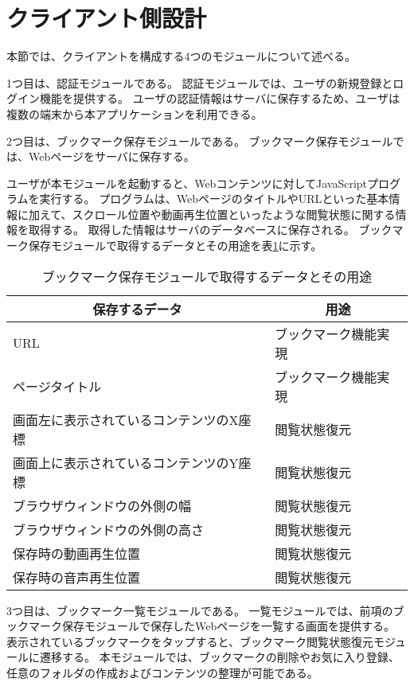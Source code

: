 \section{クライアント側設計}
本節では、クライアントを構成する4つのモジュールについて述べる。

1つ目は、認証モジュールである。
認証モジュールでは、ユーザの新規登録とログイン機能を提供する。
ユーザの認証情報はサーバに保存するため、ユーザは複数の端末から本アプリケーションを利用できる。

2つ目は、ブックマーク保存モジュールである。
ブックマーク保存モジュールでは、Webページをサーバに保存する。

ユーザが本モジュールを起動すると、Webコンテンツに対してJavaScriptプログラムを実行する。
プログラムは、WebページのタイトルやURLといった基本情報に加えて、スクロール位置や動画再生位置といったような閲覧状態に関する情報を取得する。
取得した情報はサーバのデータベースに保存される。
ブックマーク保存モジュールで取得するデータとその用途を表\ref{tb:design-save-bookmark-data-usage}に示す。

\begin{table}[htbp]
  \label{tb:design-save-bookmark-data-usage}
  \caption{ブックマーク保存モジュールで取得するデータとその用途}
  \begin{center}
    \begin{tabular}{|l|l|}
      \hline
      \multicolumn{1}{|c|}{\textbf{保存するデータ}} & \multicolumn{1}{|c|}{\textbf{用途}} \\\hline
      URL & ブックマーク機能実現 \\\hline
      ページタイトル & ブックマーク機能実現 \\\hline
      画面左に表示されているコンテンツのX座標 & 閲覧状態復元 \\\hline
      画面上に表示されているコンテンツのY座標 & 閲覧状態復元 \\\hline
      ブラウザウィンドウの外側の幅 & 閲覧状態復元 \\\hline
      ブラウザウィンドウの外側の高さ & 閲覧状態復元 \\\hline
      保存時の動画再生位置 & 閲覧状態復元 \\\hline
      保存時の音声再生位置 & 閲覧状態復元 \\\hline
    \end{tabular}
  \end{center}
\end{table}

3つ目は、ブックマーク一覧モジュールである。
一覧モジュールでは、前項のブックマーク保存モジュールで保存したWebページを一覧する画面を提供する。
表示されているブックマークをタップすると、ブックマーク閲覧状態復元モジュールに遷移する。
本モジュールでは、ブックマークの削除やお気に入り登録、任意のフォルダの作成およびコンテンツの整理が可能である。

